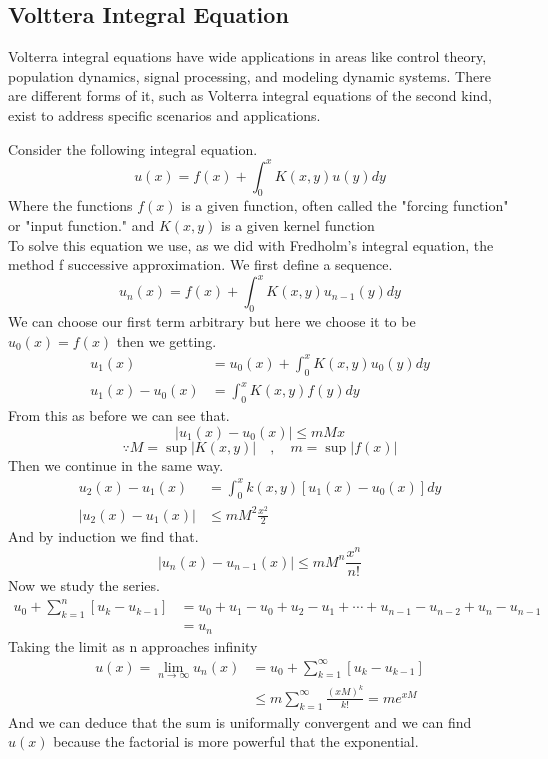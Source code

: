\subsection{Volttera Integral Equation}
Volterra integral equations have wide applications in areas like control theory, 
population dynamics, signal processing, and modeling dynamic systems. 
There are different forms of it, such as Volterra integral equations of the second kind, exist to address specific scenarios and applications.
\par 
Consider the following  integral equation.
\[
u(x) = f(x) + \int_{0}^{x} K(x,y) u(y)dy
\]
Where the functions $f(x)$ is a given function, often called the "forcing function" or "input function."
and $K(x,y)$ is a given kernel function
\\
To solve this equation we use, as we did with Fredholm's integral equation, the method f successive approximation. We first define a sequence.
\[
u_n(x) = f(x) + \int_{0}^{x} K(x,y) u_{n-1}(y)dy    
\]
We can choose our first term arbitrary but here we choose it to be $u_0(x) = f(x)$ then we getting.
\begin{align*}
u_1(x) &= u_0(x) + \int_{0}^{x} K(x,y) u_0(y)dy
\\
u_1(x) - u_0(x) &= \int_{0}^{x} K(x,y) f(y)dy
\end{align*}
From this as before we can see that.
\[
|u_1(x) - u_0(x)| \leq mMx
\]
\[
\because M=\sup|K(x,y)| \quad , \quad m=\sup |f(x)|        
\]
Then we continue in the same way.
\begin{align*}
u_2(x) - u_1(x) &= \int_{0}^{x} k(x,y) [u_1(x) - u_0(x)] dy
\\
|u_2(x) - u_1(x)| &\leq mM^2\frac{x^2}{2}
\end{align*}
And by induction we find that.
\[
|u_n(x) - u_{n-1}(x)| \leq mM^n\frac{x^n}{n!}    
\]
Now we study the series.
\begin{align*}
u_0 + \sum_{k=1}^{n} [u_k-u_{k-1}] &= u_0 + u_1 - u_0 +u_2 - u_1 + \cdots +u_{n-1}-u_{n-2}+ u_n - u_{n-1} 
\\
&= u_n
\end{align*}
Taking the limit as n approaches infinity
\begin{align*}
u(x) = \lim_{n\to \infty} u_n(x) &= u_0 + \sum_{k=1}^{\infty} [u_k-u_{k-1}]    
\\
& \leq m\sum_{k=1}^{\infty} \frac{{(xM)}^k}{k!} = m e^{xM}
\end{align*}
And we can deduce that the sum is uniformally convergent and we can find $u(x)$ because the factorial is more powerful that the exponential.

